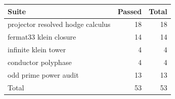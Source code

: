 \begin{tabular}{lrr}\toprule Suite & Passed & Total \\
\midrule
projector resolved hodge calculus & 18 & 18 \\
fermat33 klein closure & 14 & 14 \\
infinite klein tower & 4 & 4 \\
conductor polyphase & 4 & 4 \\
odd prime power audit & 13 & 13 \\
\midrule Total & 53 & 53 \\
\bottomrule\end{tabular}
